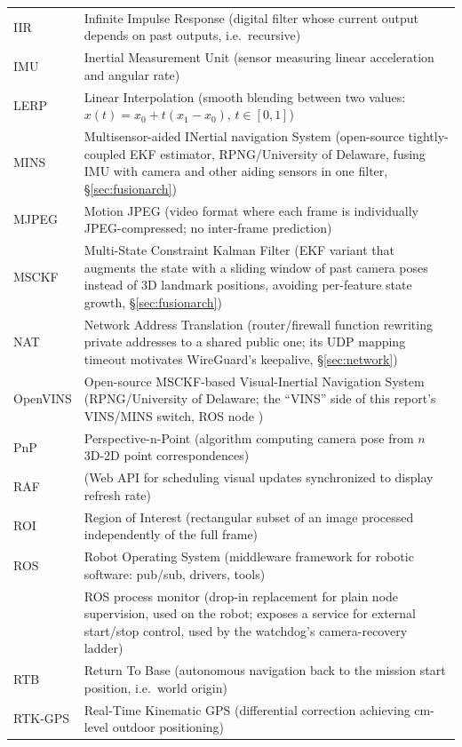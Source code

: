 \begin{longtable}{@{}L{3.6cm}L{10cm}@{}}
IIR & Infinite Impulse Response (digital filter whose current output depends on past outputs, i.e.\ recursive) \\
IMU & Inertial Measurement Unit (sensor measuring linear acceleration and angular rate) \\
LERP & Linear Interpolation (smooth blending between two values: $x(t)=x_0+t(x_1-x_0)$, $t\in[0,1]$) \\
MINS & Multisensor-aided INertial navigation System (open-source tightly-coupled EKF estimator, RPNG/University of Delaware, fusing IMU with camera and other aiding sensors in one filter, \S\ref{sec:fusionarch}) \\
MJPEG & Motion JPEG (video format where each frame is individually JPEG-compressed; no inter-frame prediction) \\
MSCKF & Multi-State Constraint Kalman Filter (EKF variant that augments the state with a sliding window of past camera poses instead of 3D landmark positions, avoiding per-feature state growth, \S\ref{sec:fusionarch}) \\
NAT & Network Address Translation (router/firewall function rewriting private addresses to a shared public one; its UDP mapping timeout motivates WireGuard's keepalive, \S\ref{sec:network}) \\
OpenVINS & Open-source MSCKF-based Visual-Inertial Navigation System (RPNG/University of Delaware; the ``VINS'' side of this report's VINS/MINS switch, ROS node ) \\
PnP & Perspective-n-Point (algorithm computing camera pose from $n$ 3D-2D point correspondences) \\
RAF &  (Web API for scheduling visual updates synchronized to display refresh rate) \\
ROI & Region of Interest (rectangular subset of an image processed independently of the full frame) \\
ROS & Robot Operating System (middleware framework for robotic software: pub/sub, drivers, tools) \\
 & ROS process monitor (drop-in replacement for plain  node supervision, used on the robot; exposes a  service for external start/stop control, used by the watchdog's camera-recovery ladder) \\
RTB & Return To Base (autonomous navigation back to the mission start position, i.e.\ world origin) \\
RTK-GPS & Real-Time Kinematic GPS (differential correction achieving cm-level outdoor positioning) \\

\end{longtable}
